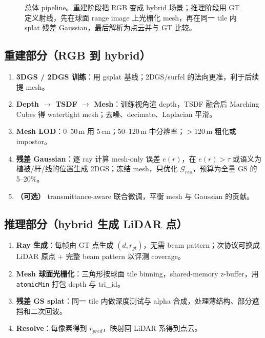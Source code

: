\documentclass[10pt,a4paper]{article}
\begin{document}
\begin{figure}[h]
\caption{总体 pipeline。重建阶段把 RGB 变成 hybrid 场景；推理阶段用 GT 定义射线，先在球面 range image 上光栅化 mesh，再在同一 tile 内 splat 残差 Gaussian，最后解析为点云并与 GT 比较。}
\end{figure}

\subsection{重建部分（RGB 到 hybrid）}
\begin{enumerate}[leftmargin=1.4em,itemsep=1pt,topsep=1pt]
\item \textbf{3DGS / 2DGS 训练}：用 gsplat 基线；2DGS/surfel 的法向更准，利于后续提 mesh。
\item \textbf{Depth $\rightarrow$ TSDF $\rightarrow$ Mesh}：训练视角渲 depth，TSDF 融合后 Marching Cubes 得 watertight mesh；去噪、decimate、Laplacian 平滑。
\item \textbf{Mesh LOD}：0--50\,m 用 5\,cm；50--120\,m 中分辨率；$>$120\,m 粗化或 impostor。
\item \textbf{残差 Gaussian}：逐 ray 计算 mesh-only 误差 $e(r)$，在 $e(r)>\tau$ 或语义为植被/杆/线的位置生成 2DGS；冻结 mesh，只优化 $\mathcal{G}_{res}$，预算为全量 GS 的 5--20\%。
\item \textbf{（可选）} transmittance-aware 联合微调，平衡 mesh 与 Gaussian 的贡献。
\end{enumerate}

\subsection{推理部分（hybrid 生成 LiDAR 点）}
\begin{enumerate}[leftmargin=1.4em,itemsep=1pt,topsep=1pt]
\item \textbf{Ray 生成}：每帧由 GT 点生成 $(d,r_{gt})$，无需 beam pattern；次协议可换成 LiDAR 原点 + 完整 beam pattern 以评测 coverage。
\item \textbf{Mesh 球面光栅化}：三角形按球面 tile binning，shared-memory z-buffer，用 \texttt{atomicMin} 打包 depth 与 tri\_id。
\item \textbf{残差 GS splat}：同一 tile 内做深度测试与 alpha 合成，处理薄结构、部分遮挡和二次回波。
\item \textbf{Resolve}：每像素得到 $r_{pred}$，映射回 LiDAR 系得到点云。
\end{enumerate}
\end{document}
